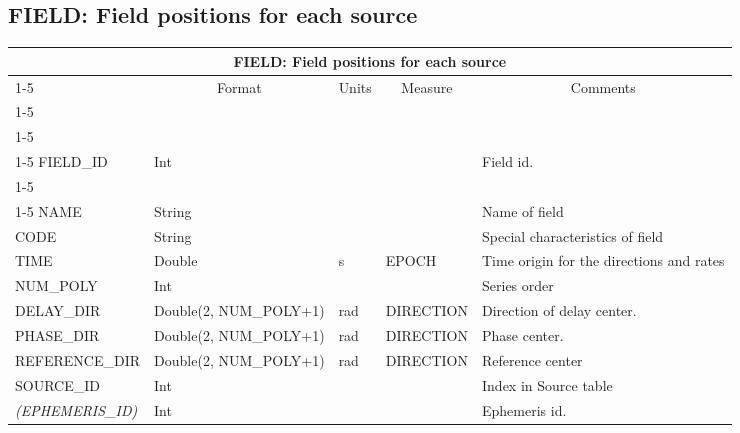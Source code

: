 \documentclass{article}
\newcommand{\defline}[1]{\cline{1-5}
\multicolumn{5}{|l|}{#1} \\
\cline{1-5}}
\newcommand{\definetable}[2]
{
	\vfill\newpage
	\subsection{#1}
        \vspace{0.15in}
        \small
	\begin{tabular}{|l|p{1.25in}|l|p{.9in}|p{1.4in}|}
	\hline
	\multicolumn{5}{|c|}{\bf #1}\\ 
	\cline{1-5}
        \multicolumn{1}{|c|}{Name}&\multicolumn{1}{|c|}{Format}&
        \multicolumn{1}{|c|}{Units}&\multicolumn{1}{|c|}{Measure}&
        \multicolumn{1}{|c|}{Comments}\\
        \cline{1-5}
        #2
        \hline
	\end{tabular}
}
\begin{document}
\definetable{FIELD: Field positions for each source}{
\defline{\bf Columns}
\defline{\em Key}
FIELD\_ID & Int & & & Field id. \\ 
\defline{\em Data}  
NAME &       String &    &      & Name of field \\
CODE &       String &    &      & Special characteristics of field \\
TIME &   Double  &      s  & EPOCH & Time origin for the directions and rates\\
NUM\_POLY & Int & & & Series order \\
DELAY\_DIR    &      Double(2, NUM\_POLY+1)  &      rad   &     DIRECTION & Direction of delay center. \\
PHASE\_DIR    &      Double(2, NUM\_POLY+1)  &      rad   &     DIRECTION & Phase center. \\
REFERENCE\_DIR &      Double(2, NUM\_POLY+1)  &      rad   &     DIRECTION & Reference center \\
SOURCE\_ID &      Int    &    &      & Index in Source table\\
{\it (EPHEMERIS\_ID)} &   Int    &    &      & Ephemeris id.\\
}
\end{document}

